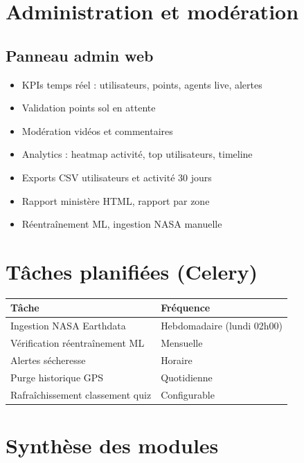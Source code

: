 \documentclass[11pt,a4paper]{report}
\begin{document}
\chapter{Administration et modération}

\section{Panneau admin web}
\begin{itemize}[leftmargin=*]
  \item KPIs temps réel : utilisateurs, points, agents live, alertes
  \item Validation points sol en attente
  \item Modération vidéos et commentaires
  \item Analytics : heatmap activité, top utilisateurs, timeline
  \item Exports CSV utilisateurs et activité 30 jours
  \item Rapport ministère HTML, rapport par zone
  \item Réentraînement ML, ingestion NASA manuelle
\end{itemize}

\chapter{Tâches planifiées (Celery)}

\begin{tabularx}{\textwidth}{@{}lX@{}}
\toprule
\textbf{Tâche} & \textbf{Fréquence} \\
\midrule
Ingestion NASA Earthdata & Hebdomadaire (lundi 02h00) \\
Vérification réentraînement ML & Mensuelle \\
Alertes sécheresse & Horaire \\
Purge historique GPS & Quotidienne \\
Rafraîchissement classement quiz & Configurable \\
\bottomrule
\end{tabularx}

\chapter{Synthèse des modules}
\end{document}
